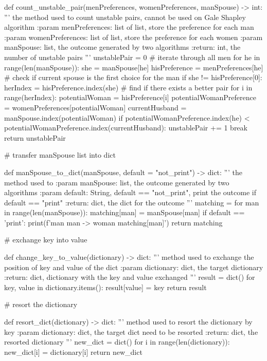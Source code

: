 \documentclass[14pt]{extarticle}
\begin{document}
\begin{python}
def count_unstable_pair(menPreferences, womenPreferences, manSpouse) -> int:
    '''
    the method used to count unstable pairs, cannot be used on Gale Shapley algorithm
    :param menPreferences: list of list, store the preference for each man
    :param womenPreferences: list of list, store the preference for each women
    :param manSpouse: list, the outcome generated by two algorithms
    :return: int, the number of unstable pairs
    '''
    unstablePair = 0
    # iterate through all men 
    for he in range(len(manSpouse)):
        she = manSpouse[he]
        hisPreference = menPreferences[he]
        # check if current spouse is the first choice for the man 
        if she != hisPreference[0]:
            herIndex = hisPreference.index(she)
            # find if there exists a better pair
            for i in range(herIndex):
                potentialWoman = hisPreference[i]
                potentialWomanPreference = womenPreferences[potentialWoman]
                currentHusband = manSpouse.index(potentialWoman)
                if potentialWomanPreference.index(he) < potentialWomanPreference.index(currentHusband):
                    unstablePair += 1
                    break
    return unstablePair

# transfer manSpouse list into dict

def manSpouse_to_dict(manSpouse, default = "not_print") -> dict:
    '''
    the method used to 
    :param manSpouse: list, the outcome generated by two algorithms
    :param default: String, default == "not_print", print the outcome if default == "print"
    :return: dict, the dict for the outcome
    '''
    matching = {}
    for man in range(len(manSpouse)):
        matching[man] = manSpouse[man]
        if default == 'print':
            print(f'man {man} -> woman {matching[man]}')
    return matching    

# exchange key into value

def change_key_to_value(dictionary) -> dict: 
    '''
    method used to exchange the position of key and value of the dict
    :param dictionary: dict, the target dictionary 
    :return: dict, dictionary with the key and value exchanged
    '''
    result = dict()
    for key, value in dictionary.items():
        result[value] = key
    return result   

# resort the dictionary

def resort_dict(dictionary) -> dict: 
    '''
    method used to resort the dictionary by key
    :param dictionary: dict, the target dict need to be resorted
    :return: dict, the resorted dictionary
    '''
    new_dict = dict()
    for i in range(len(dictionary)):
        new_dict[i] = dictionary[i]
    return new_dict    


\end{python}
\end{document}
